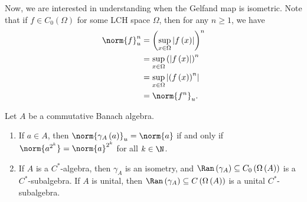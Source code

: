 \documentclass[10pt]{mypackage}
\begin{document}
Now, we are interested in understanding when the Gelfand map is isometric. Note that if $f\in C_0\left(\Omega\right)$ for some LCH space $\Omega$, then for any $n\geq 1$, we have
\begin{align*}
  \norm{f}_u^n &= \left(\sup_{x\in\Omega}\left\vert f\left(x\right) \right\vert\right)^n\\
               &= \sup_{x\in\Omega}\left(\left\vert f\left(x\right) \right\vert\right)^n\\
               &= \sup_{x\in\Omega}\left\vert \left(f\left(x\right)\right)^n \right\vert\\
               &= \norm{f^n}_u.
\end{align*}
\begin{proposition}
  Let $A$ be a commutative Banach algebra.
  \begin{enumerate}[(1)]
    \item If $a\in A$, then $\norm{\gamma_A\left(a\right)}_u = \norm{a}$ if and only if $\norm{a^{2^k}} = \norm{a}^{2^k}$ for all $k\in\N$.
    \item If $A$ is a $C^{\ast}$-algebra, then $\gamma_A$ is an isometry, and $\Ran\left(\gamma_A\right)\subseteq C_0\left(\Omega\left(A\right)\right)$ is a $C^{\ast}$-subalgebra. If $A$ is unital, then $\Ran\left(\gamma_A\right)\subseteq C\left(\Omega\left(A\right)\right)$ is a unital $C^{\ast}$-subalgebra.
  \end{enumerate}
\end{proposition}
\end{document}
